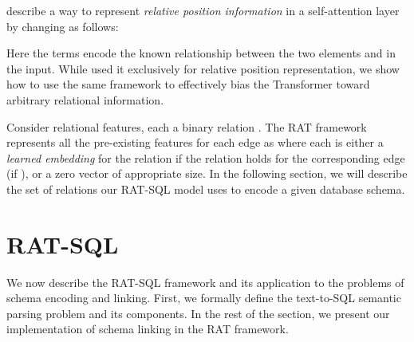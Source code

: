 \documentclass[11pt,a4paper,final]{article}
\begin{document}
\citet{shawSelfAttentionRelativePosition2018} describe a way to represent \emph{relative position information} in a
self-attention layer by changing  as follows:

Here the  terms encode the known relationship between the two elements  and  in
the input.
While \citeauthor{shawSelfAttentionRelativePosition2018} used it exclusively for relative position representation, we
show how to use the same framework to effectively bias the Transformer toward arbitrary relational information.

Consider  relational features, each a binary relation
\mbox{} \mbox{}.
The RAT framework represents all the pre-existing features for each edge  as  where
each  is either a \emph{learned embedding} for the relation  if the
relation holds for the corresponding edge (\ie if ), or a zero vector of appropriate
size.
In the following section, we will describe the set of relations our RAT-SQL model uses to encode a given database schema.
 \section{RAT-SQL}
\label{sec:our-encoder}
We now describe the RAT-SQL framework and its application to the problems of schema encoding and linking.
First, we formally define the text-to-SQL semantic parsing problem and its components.
In the rest of the section, we present our implementation of schema linking in the RAT framework.
\end{document}
